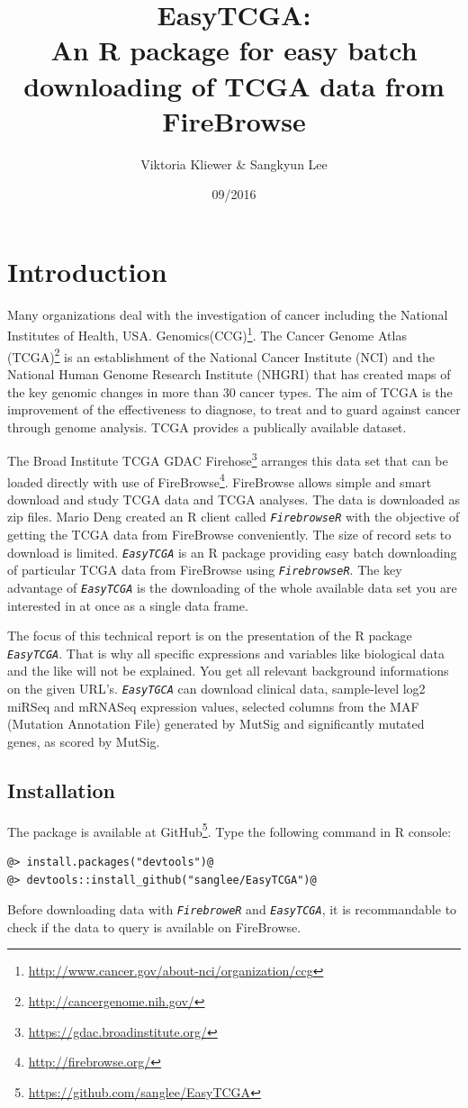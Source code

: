 \documentclass{TechReport}
\title{EasyTCGA:\\ An R package for easy batch downloading of TCGA data from FireBrowse}
\author{Viktoria Kliewer \& Sangkyun Lee}
\date{09/2016}        %
\begin{document}
\makesfbtitlepage

\section{Introduction}
Many organizations deal with the investigation of cancer including the National
Institutes of Health, USA.
Genomics(CCG)\footnote{\url{http://www.cancer.gov/about-nci/organization/ccg}}.
The Cancer Genome Atlas
(TCGA)\footnote{\url{http://cancergenome.nih.gov/}} is an
establishment of the National Cancer Institute (NCI) and the National
Human Genome Research Institute (NHGRI) that has created maps of the
key genomic changes in more than 30 cancer types. The aim of TCGA is
the improvement of the effectiveness to diagnose, to treat and to guard
against cancer through genome analysis. TCGA provides a publically
available dataset.

The Broad Institute TCGA GDAC
Firehose\footnote{\url{https://gdac.broadinstitute.org/}} arranges
this data set that can be loaded directly with use of
FireBrowse\footnote{\url{http://firebrowse.org/}}. FireBrowse allows
simple and smart download and study TCGA data and TCGA analyses. The
data is
downloaded as zip files.
Mario Deng created an R client called \texttt{\em FirebrowseR} with
the objective of getting the TCGA data from FireBrowse conveniently.
The size of record sets to download is limited. \texttt{\em EasyTCGA}
is an R package providing easy batch downloading of particular TCGA
data from FireBrowse using \texttt{\em FirebrowseR}. The key advantage
of \texttt{\em EasyTCGA} is the downloading of the whole available
data set you are interested in at once as a single data frame.

The focus of this technical report is on the presentation of the R
package \texttt{\em EasyTCGA}. That is why all specific expressions and
variables like biological data and the like will not be explained. You
get all relevant
background informations on the given URL's.
\texttt{\em EasyTGCA} can download clinical data, sample-level log2
miRSeq and mRNASeq expression values, selected columns from the MAF
(Mutation Annotation File) generated by MutSig and significantly
mutated genes, as scored by MutSig.

\subsection{Installation}
The package is available at
GitHub\footnote{\url{https://github.com/sanglee/EasyTCGA}}. Type the following
command in R console:
\begin{lstlisting}[style=base]
@> install.packages("devtools")@
@> devtools::install_github("sanglee/EasyTCGA")@
\end{lstlisting}
Before downloading data with \texttt{\em FirebroweR} and \texttt{\em EasyTCGA}, it is
recommandable to check if the data to query is available 
on FireBrowse\footnotemark[4].\\
\end{document}

